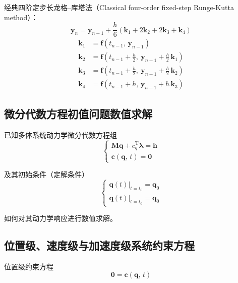 经典四阶定步长龙格--库塔法（Classical four-order fixed-step Runge-Kutta method）：
\begin{equation}\label{eq:3.classical_rk}
\boldsymbol{y}_n = \boldsymbol{y}_{n-1} + \frac{h}{6}\left(\boldsymbol{k}_1 + 2\boldsymbol{k}_2 + 2\boldsymbol{k}_3 + \boldsymbol{k}_4\right)
\end{equation}
\begin{align}
\boldsymbol{k}_1 &= \boldsymbol{f}(t_{n-1},\, \boldsymbol{y}_{n-1}) \\
\boldsymbol{k}_2 &= \boldsymbol{f}\!\left(t_{n-1} + \frac{h}{2},\ \boldsymbol{y}_{n-1} + \frac{h}{2}\, \boldsymbol{k}_1\right) \\
\boldsymbol{k}_3 &= \boldsymbol{f}\!\left(t_{n-1} + \frac{h}{2},\ \boldsymbol{y}_{n-1} + \frac{h}{2}\, \boldsymbol{k}_2\right) \\
\boldsymbol{k}_4 &= \boldsymbol{f}(t_{n-1} + h,\, \boldsymbol{y}_{n-1} + h\, \boldsymbol{k}_3)
\end{align}


\subsection{微分代数方程初值问题数值求解}

已知多体系统动力学微分代数方程组
\begin{equation}
\begin{cases}
\boldsymbol{M} \ddot{\boldsymbol{q}} + c_q^{\mathrm{T}} \boldsymbol{\lambda} = \boldsymbol{h} \\[4pt]
\boldsymbol{c}(\boldsymbol{q},\, t) = \boldsymbol{0}
\end{cases}
\end{equation}

及其初始条件（定解条件）
\begin{equation}
\begin{cases}
\boldsymbol{q}(t)\big|_{t=t_0} = \boldsymbol{q}_0 \\[4pt]
\dot{\boldsymbol{q}}(t)\big|_{t=t_0} = \dot{\boldsymbol{q}}_0
\end{cases}
\end{equation}

如何对其动力学响应进行数值求解。


\subsection{位置级、速度级与加速度级系统约束方程}

位置级约束方程
\begin{equation}\label{eq:3.pos_constraint}
\boldsymbol{0} = \boldsymbol{c}(\boldsymbol{q},\, t)
\end{equation}

